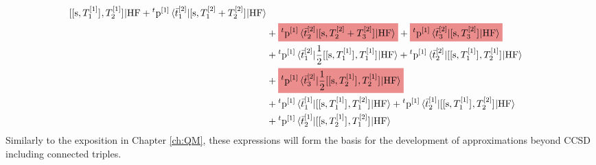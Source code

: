 \begin{equation}
\begin{aligned}
{    \commutator{\commutator{\s}{T_1^{[1]}}}{T_2^{[1]}}
    | \mathrm{HF}}
    +
    {}^t\p^{[1]}
    \braket{\tbar{1}^{[2]} | \commutator{\s}{T_1^{[2]} + T_2^{[2]}} |
    \mathrm{HF}} \\
    &+
    \highlight{brewerRed}{
    {}^t\p^{[1]}
    \braket{\tbar{2}^{[2]} | \commutator{\s}{T_2^{[2]} + T_3^{[2]}} | \mathrm{HF}}
    }
    +
    \highlight{brewerRed}{
    {}^t\p^{[1]}
    \braket{\tbar{3}^{[2]} | \commutator{\s}{T_3^{[2]}} | \mathrm{HF}}
    } \\
    &+
    {}^t\p^{[1]}
    \braket{\tbar{1}^{[2]} |
    \frac{1}{2}\commutator{\commutator{\s}{T_1^{[1]}}}{T_1^{[1]}}
    | \mathrm{HF}}
    +
    {}^t\p^{[1]}
    \braket{\tbar{2}^{[2]} |
    \commutator{\commutator{\s}{T_1^{[1]}}}{T_2^{[1]}}
    | \mathrm{HF}} \\
    &+
    \highlight{brewerRed}{
    {}^t\p^{[1]}
    \braket{\tbar{3}^{[2]} |
    \frac{1}{2}\commutator{\commutator{\s}{T_2^{[1]}}}{T_2^{[1]}}
    | \mathrm{HF}}
    } \\
    &+ {}^t\p^{[1]}
    \braket{\tbar{1}^{[1]} |
    \commutator{\commutator{\s}{T_1^{[1]}}}{T_1^{[2]}}
    | \mathrm{HF}}
    + {}^t\p^{[1]}
    \braket{\tbar{2}^{[1]} |
    \commutator{\commutator{\s}{T_1^{[1]}}}{T_2^{[2]}}
    | \mathrm{HF}} \\
    &+ {}^t\p^{[1]}
    \braket{\tbar{2}^{[1]} |
    \commutator{\commutator{\s}{T_2^{[1]}}}{T_1^{[2]}}
    | \mathrm{HF}}
  \end{aligned}
\end{equation}
Similarly to the exposition in Chapter \ref{ch:QM}, these expressions
will form the basis for the development of approximations
beyond \acrshort*{CCSD} including connected triples.

